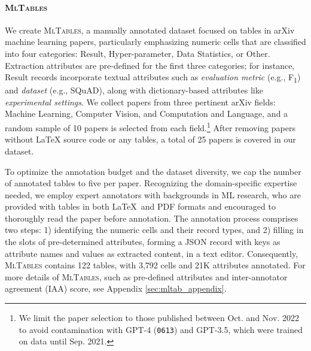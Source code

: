 \documentclass[11pt]{article}
\newcommand\data{\textsc{MlTables}}
\begin{document}
\paragraph{\data{}} We create \data{}, a manually annotated dataset 
focused on tables in arXiv machine learning papers, particularly emphasizing numeric cells that are classified into four categories: Result, Hyper-parameter, Data Statistics, or Other. Extraction attributes are pre-defined for the first three categories; for instance, Result records incorporate textual 
attributes such as \textit{evaluation metric} (e.g., F\textsubscript{1}) and \textit{dataset} (e.g., SQuAD), along with dictionary-based attributes like \textit{experimental settings}. 
We collect papers from three pertinent arXiv fields: Machine Learning, Computer Vision, and Computation and Language, and a random sample of 10 papers is selected from each field.\footnote{We limit the paper selection to those published between Oct. and Nov. 2022 to avoid contamination with GPT-4 (\texttt{0613}) and GPT-3.5, which were trained on data until Sep. 2021.} After removing papers without \LaTeX{} source code or any tables, a total of 25 papers is covered in our dataset. 





To optimize the annotation budget and the dataset diversity, we cap the number of annotated tables to five per paper. Recognizing the domain-specific expertise needed, we employ expert annotators with backgrounds in ML research, who are provided with tables in both \LaTeX~and PDF formats and encouraged to thoroughly read the paper before annotation. The annotation process comprises two steps: 1) identifying the numeric cells and their record types, and 2) filling in the slots of pre-determined attributes, forming a JSON record with keys as attribute names and values as extracted content, in a text editor. Consequently, \data{} contains 122 tables, with 3,792 cells and 21K attributes annotated. For more details of \data{}, such as pre-defined attributes and inter-annotator agreement (IAA) score, see Appendix \ref{sec:mltab_appendix}.




\newcommand{\subfifty}[1]{}
\newcommand{\icfifty}{\subfifty{IC}}
\end{document}

